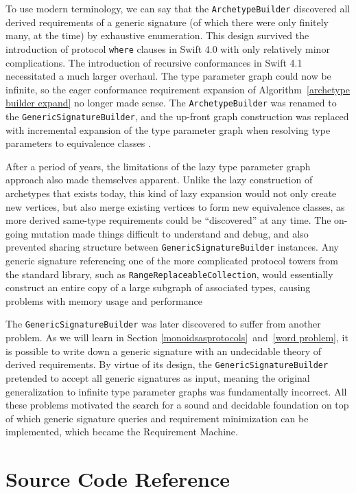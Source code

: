 \documentclass[../generics]{subfiles}
\begin{document}
To use modern terminology, we can say that the \texttt{ArchetypeBuilder} discovered all derived requirements of a generic signature (of which there were only finitely many, at the time) by exhaustive enumeration. This design survived the introduction of protocol \texttt{where} clauses in Swift 4.0 with only relatively minor complications. The introduction of recursive conformances in Swift 4.1 necessitated a much larger overhaul. The type parameter graph could now be infinite, so the eager conformance requirement expansion of Algorithm~\ref{archetype builder expand} no longer made sense. The \texttt{ArchetypeBuilder} was renamed to the \texttt{GenericSignatureBuilder}, and the up-front graph construction was replaced with incremental expansion of the type parameter graph when resolving type parameters to equivalence classes \cite{implrecursive}.

After a period of years, the limitations of the lazy type parameter graph approach also made themselves apparent. Unlike the lazy construction of archetypes that exists today, this kind of lazy expansion would not only create new vertices, but also merge existing vertices to form new equivalence classes, as more derived same-type requirements could be ``discovered'' at any time. The on-going mutation made things difficult to understand and debug, and also prevented sharing structure between \texttt{GenericSignatureBuilder} instances. Any generic signature referencing one of the more complicated protocol towers from the standard library, such as \texttt{RangeReplaceableCollection}, would essentially construct an entire copy of a large subgraph of associated types, causing problems with memory usage and performance

The \texttt{GenericSignatureBuilder} was later discovered to suffer from another problem. As we will learn in Section \ref{monoidsasprotocols}~and~\ref{word problem}, it is possible to write down a generic signature with an undecidable theory of derived requirements. By virtue of its design, the \texttt{GenericSignatureBuilder} pretended to accept all generic signatures as input, meaning the original generalization to infinite type parameter graphs was fundamentally incorrect. All these problems motivated the search for a sound and decidable foundation on top of which generic signature queries and requirement minimization can be implemented, which became the Requirement Machine.

\section{Source Code Reference}
\end{document}
